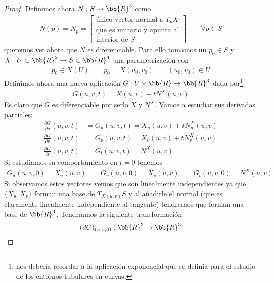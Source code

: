 \begin{teo}
\begin{proof}
        Definimos ahora $N:S\to \bb{R}^3$ como 
        \begin{gather*}
            N(p)=N_p =
            \left[
            \begin{array}{c}
                \text{único vector normal a $T_pX$}\\
                \text{que es unitario y apunta al}\\
                \text{interior de $S$}
            \end{array}
            \right]
            \qquad \forall p\in S
        \end{gather*}
        queremos ver ahora que $N$ es diferenciable. Para ello tomamos un $p_0\in S$ y $X:U\subset \bb{R}^2 \to S\subset \bb{R}^3$ una parametrización con
        \begin{gather*}
            p_0\in X(U) \qquad p_0=X(u_0,v_0) \qquad (u_0,v_0)\in U
        \end{gather*}
        Definimos ahora una nueva aplicación $G:U\times \bb{R} \to \bb{R}^3$ dada por\footnote{nos debería recordar a la aplicación exponencial que se definía para el estudio de los entornos tubulares en curvas.}
        \begin{gather*}
            G(u,v,t) = X(u,v) + tN^X(u,v)
        \end{gather*}
        Es claro que $G$ es diferenciable por serlo $X$ y $N^X$. Vamos a estudiar sus derivadas parciales:
        \begin{align*}
            \frac{\partial G}{\partial u} (u,v,t) &= G_u(u,v,t) = X_u(u,v) + t N^X_u(u,v)\\[1em]
            \frac{\partial G}{\partial v} (u,v,t) &= G_v(u,v,t) = X_v(u,v) + t N^X_v(u,v)\\[1em]
            \frac{\partial G}{\partial t} (u,v,t) &= G_t(u,v,t) = N^X(u,v)
        \end{align*}
        Si estudiamos su comportamiento en $t=0$ tenemos
        \begin{gather*}
            G_u(u,v,0) = X_u(u,v)\qquad
            G_v(u,v,0) = X_v(u,v)\qquad
            G_t(u,v,0) = N^X(u,v)
        \end{gather*}
        Si observamos estos vectores vemos que son linealmente independientes ya que $\{X_u, X_v\}$ forman una base de $T_{X(u,v)}S$ y al añadirle el normal (que es claramente linealmente independiente al tangente) tendremos que forman una base de $\bb{R}^3$. Tendríamos la siguiente transformación
        \begin{align*}
            (dG)_{(u,v,0)} &: \bb{R}^3 \to \bb{R}^3\\

\end{align*}
\end{proof}
\end{teo}
